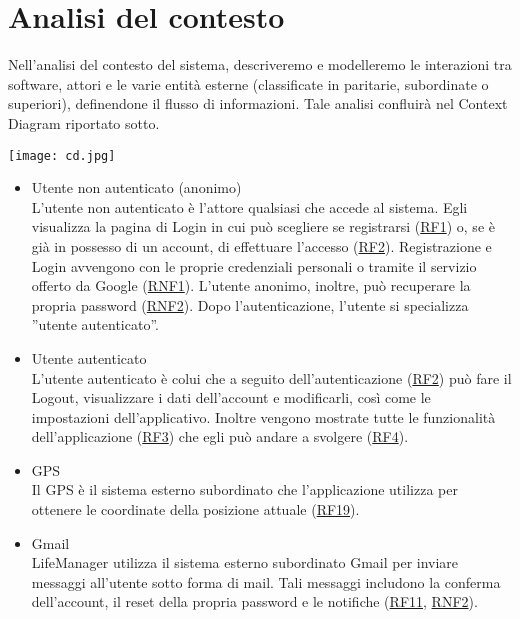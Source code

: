 \documentclass[a4paper,12pt]{article}
\begin{document}
\section*{Analisi del contesto}
Nell'analisi del contesto del sistema, descriveremo e modelleremo le interazioni tra software, attori e le varie entità esterne (classificate in paritarie, subordinate o superiori), definendone il flusso di informazioni. Tale analisi confluirà nel Context Diagram riportato sotto.

\begin{center}
  \texttt{[image: cd.jpg]}
\end{center}

\begin{itemize} \setlength\itemsep{0.01em}
  \item{\sffamily  Utente non autenticato (anonimo)}
    \\L'utente non autenticato è l'attore qualsiasi che accede al sistema. Egli visualizza la pagina di Login in cui può scegliere se registrarsi (\hyperlink{RF1}{RF1}) o, se è già in possesso di un account, di effettuare l'accesso (\hyperlink{RF2}{RF2}). Registrazione e Login avvengono con le proprie credenziali personali o tramite il servizio offerto da Google (\hyperlink{RNF1}{RNF1}). L'utente anonimo, inoltre, può recuperare la propria password (\hyperlink{RNF2}{RNF2}).
    Dopo l'autenticazione, l'utente si specializza ''utente autenticato''.
    
    
 \item{\sffamily Utente autenticato}\\
    L'utente autenticato è colui che a seguito dell'autenticazione (\hyperlink{RF2}{RF2}) può fare il Logout, visualizzare i dati dell'account e modificarli, così come le impostazioni dell'applicativo. Inoltre vengono mostrate tutte le funzionalità dell'applicazione (\hyperlink{RF3}{RF3}) che egli può andare a svolgere (\hyperlink{RF4}{RF4}). 
   
   
  \item{\sffamily GPS}\\
    Il GPS è il sistema esterno subordinato che l'applicazione utilizza per ottenere le coordinate della posizione attuale (\hyperlink{RF19}{RF19}).
    
    
  \item{\sffamily Gmail}\\
    LifeManager utilizza il sistema esterno subordinato Gmail per inviare messaggi all'utente sotto forma di mail. Tali messaggi includono la conferma dell'account, il reset della propria password e le notifiche (\hyperlink{RF11}{RF11}, \hyperlink{RNF2}{RNF2}).
  

\end{itemize}
\end{document}
